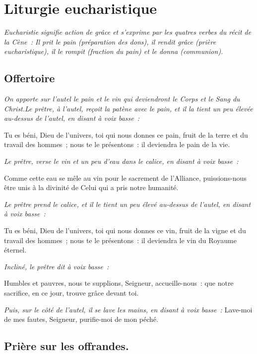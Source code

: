 \section*{Liturgie eucharistique}

\emph{Eucharistie signifie action de grâce et s'exprime par les                 
quatres verbes du récit de la Cène~: Il prit le pain (préparation des           
dons), il rendit grâce (prière eucharistique), il le rompit (fraction           
du pain) et le donna (communion).}

\subsection*{Offertoire}

\emph{On apporte sur l'autel le pain et le vin qui deviendront le               
Corps et le Sang du Christ.Le prêtre, à l'autel, reçoit la patène avec          
le pain, et il la tient un peu élevée au-dessus de l'autel, en disant           
à voix basse~: }

Tu es béni, Dieu de l'univers, toi qui nous donnes ce pain, fruit de
la terre et du travail des hommes~; nous te le présentons~: il
deviendra le pain de la vie.

\emph{Le prêtre, verse le vin et un peu d'eau dans le calice, en                
disant à voix basse~:}

Comme cette eau se mêle au vin pour le sacrement de l'Alliance,
puissions-nous être unis à la divinité de Celui qui a pris notre
humanité.

\emph{Le prêtre prend le calice, et il le tient un peu élevé au-dessus          
de l'autel, en disant à voix basse~: }

Tu es béni, Dieu de l'univers, toi qui nous donnes ce vin, fruit de la
vigne et du travail des hommes~; nous te le présentons~: il deviendra
le vin du Royaume éternel.

\emph{Incliné, le prêtre dit à voix basse~: }

Humbles et pauvres, nous te supplions, Seigneur, accueille-nous~: que
notre sacrifice, en ce jour, trouve grâce devant toi.

\emph{Puis, sur le côté de l'autel, il se lave les mains, en disant à           
voix basse~:} Lave-moi de mes fautes, Seigneur, purifie-moi de mon
péché.

\subsection*{Prière sur les offrandes.}


